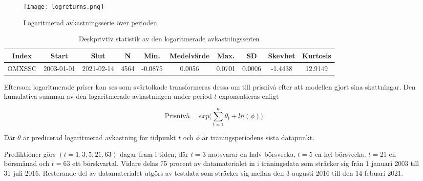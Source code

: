 \documentclass[11pt]{article}
\numberwithin{equation}{section}
\numberwithin{table}{section}
\numberwithin{figure}{section}
\begin{document}
\begin{figure}[H]
\caption{Logaritmerad avkastningsserie över perioden}
\texttt{[image: logreturns.png]}
\centering
\end{figure}

\begin{table}[H]
\caption{Deskprivtiv statistik av den logaritmerade avkastningsserien}
\begin{adjustbox}{width=1\textwidth}
\begin{tabular}{|c|c|c|c|c|c|c|c|c|c|}
\hline
Index & Start & Slut & N & Min. & Medelvärde & Max. & SD & Skevhet & Kurtosis \\ \hline
OMXSSC   & 2003-01-01 & 2021-02-14 & 4564 & -0.0875 & 0.0056 & 0.0701 & 0.0006 & -1.4438 & 12.9149 \\ \hline
\end{tabular}
\end{adjustbox}
\end{table}

Eftersom logaritmerade priser kan ses som svårtolkade transformeras dessa om till prisnivå efter att modellen gjort sina skattningar. Den kumulativa summan av den logaritmerade avkastningen under period $t$ exponentieras enligt

\begin{equation}
    \text{Prisnivå} =  exp\Big({\sum\limits_{t=1}^n \theta_{t}} + ln(\phi)\Big)
\end{equation}

Där  $\theta$ är predicerad logaritmerad avkastning för tidpunkt $t$ och $\phi$ är träningsperiodens sista datapunkt. 




Prediktioner görs $(t=1, 3, 5, 21, 63)$ dagar fram i tiden, där $t=3$ motsvarar en halv börsvecka, $t=5$ en hel börsvecka, $t=21$ en börsmånad och $t=63$ ett börskvartal. Vidare delas 75 procent av datamaterialet in i träningsdata som sträcker sig från 1 januari 2003 till 31 juli 2016. Resterande del av datamaterialet utgörs av testdata som sträcker sig mellan den 3 augusti 2016 till den 14 febuari 2021. 
\end{document}
